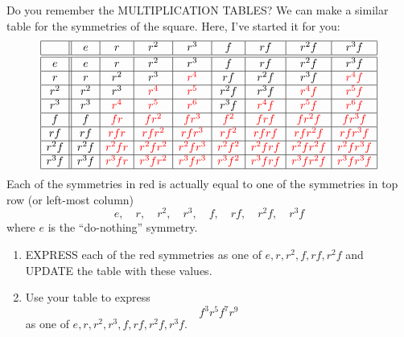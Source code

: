 \documentclass[noauthor,nooutcomes,hints]{ximera}
\begin{document}
\begin{question}
  Do you remember the MULTIPLICATION TABLES? We can make a similar
  table for the symmetries of the square. Here, I've started it for
  you:
  \[
  \begin{array}{|c||c|c|c|c|c|c|c|c|}
    \hline
         & e    & r     & r^2     & r^3      & f      & rf     & r^2f      &  r^3 f\\ \hline\hline
    e    & e    & r     & r^2     & r^3      & f      & rf     & r^2f      &  r^3 f\\ \hline
    r    & r    & r^2   & r^3     & \color{red}r^4      & rf     & r^2f   & r^3f      & \color{red}r^4f\\ \hline
    r^2  & r^2  & r^3   & \color{red}r^4     & \color{red}r^5      & r^2f   & r^3f   & \color{red}r^4f      & \color{red}r^5f\\ \hline
    r^3  & r^3  & \color{red}r^4   & \color{red}r^5     & \color{red}r^6      & r^3f   & \color{red}r^4f   & \color{red}r^5f      & \color{red}r^6f\\ \hline
    f    & f    & \color{red}fr    & \color{red}fr^2    & \color{red}fr^3     & \color{red}f^2    & \color{red}frf    & \color{red}fr^2f     & \color{red}fr^3f\\ \hline
    rf   & rf   & \color{red}rfr   & \color{red}rfr^2   & \color{red}rfr^3    & \color{red}rf^2   & \color{red}rfrf   & \color{red}rfr^2f    & \color{red}rfr^3f\\ \hline
    r^2f & r^2f & \color{red}r^2fr & \color{red}r^2fr^2 & \color{red}r^2fr^3  & \color{red}r^2f^2 & \color{red}r^2frf & \color{red}r^2fr^2f  & \color{red}r^2fr^3f\\ \hline
    r^3f & r^3f & \color{red}r^3fr & \color{red}r^3fr^2 & \color{red}r^3fr^3  & \color{red}r^3f^2 & \color{red}r^3frf & \color{red}r^3f r^2f & \color{red}r^3fr^3f\\ \hline
  \end{array}
  \]
  Each of the symmetries in red is actually equal to one of the
  symmetries in top row (or left-most column)
  \[
  e,\quad r,\quad r^2,\quad r^3,\quad f,\quad rf,\quad r^2f,\quad r^3f
  \]
  where $e$ is the ``do-nothing'' symmetry.
  \begin{enumerate}
    \item EXPRESS each of the red symmetries as one of
      $e,r,r^2,f,rf,r^2f$ and UPDATE the table with these values.
    \item Use your table to express
      \[
      f^3r^5f^7r^9
      \]
      as one of $e,r,r^2,r^3,f,rf,r^2f, r^3f$.

\end{enumerate}
\end{question}
\end{document}
